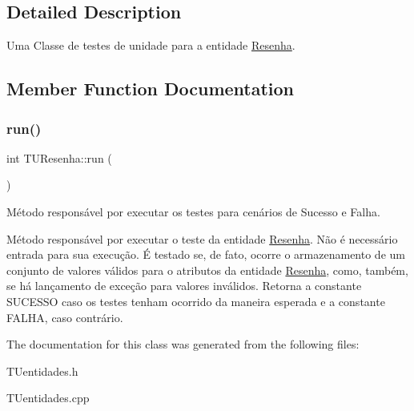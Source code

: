 \subsection{Detailed Description}
Uma Classe de testes de unidade para a entidade \hyperlink{classResenha}{Resenha}. 

\subsection{Member Function Documentation}
\mbox{\label{classTUResenha_a255531383ebe29a85c654a848288d89c}} 
\subsubsection{\texorpdfstring{run()}{run()}}
{\footnotesize\ttfamily int T\+U\+Resenha\+::run (\begin{DoxyParamCaption}{ }\end{DoxyParamCaption})}



Método responsável por executar os testes para cenários de Sucesso e Falha. 

Método responsável por executar o teste da entidade \hyperlink{classResenha}{Resenha}. Não é necessário entrada para sua execução. É testado se, de fato, ocorre o armazenamento de um conjunto de valores válidos para o atributos da entidade \hyperlink{classResenha}{Resenha}, como, também, se há lançamento de exceção para valores inválidos. Retorna a constante S\+U\+C\+E\+S\+SO caso os testes tenham ocorrido da maneira esperada e a constante F\+A\+L\+HA, caso contrário. 

The documentation for this class was generated from the following files\+:\begin{DoxyCompactItemize}
\item 
T\+Uentidades.\+h\item 
T\+Uentidades.\+cpp\end{DoxyCompactItemize}
